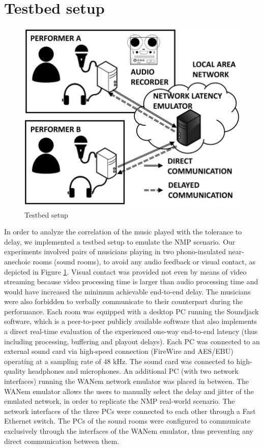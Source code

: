 \section{Testbed setup}\label{sec:NMP:testbed}
\begin{figure}[!tb]
  \centering
  \includegraphics[width=.95\textwidth]{img/NMP/setup}
  \caption{Testbed setup}
 \label{fig:NMP:testbed}
\end{figure}
In order to analyze the correlation of the music played with the tolerance to delay, we implemented a testbed setup to emulate the NMP scenario. Our experiments involved pairs of musicians playing in two phono-insulated near-anechoic rooms (sound rooms), to avoid any audio feedback or visual contact, as depicted in Figure \ref{fig:NMP:testbed}. Visual contact was provided not even by means of video streaming because video processing time is larger than audio processing time and would have increased the minimum achievable end-to-end delay. The musicians were also forbidden to verbally communicate to their counterpart during the performance. Each room was equipped with a desktop PC running the Soundjack software, which is a peer-to-peer publicly available software \cite{carot2008distributed} that also implements a direct real-time evaluation of the experienced one-way end-to-end latency (thus including processing, buffering and playout delays).  Each PC was connected to an external sound card via high-speed connection (FireWire and AES/EBU) operating at a sampling rate of 48 kHz. The sound card was connected to high-quality headphones and microphones. An additional PC (with two network interfaces) running the WANem network emulator \cite{wanem} was placed in between. 
The WANem emulator allows the users to manually select the delay and jitter of the emulated network, in order to replicate the NMP real-world scenario. The network interfaces of the three PCs were connected to each other through a Fast Ethernet switch. The PCs of the sound rooms were configured to communicate exclusively through the interfaces of the WANem emulator, thus preventing any direct communication between them. 

